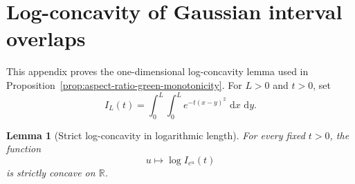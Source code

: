 \documentclass[11pt]{article}
\newtheorem{lemma}[theorem]{Lemma}
\newcommand{\R}{\mathbb{R}}
\newcommand{\dd}{\,\mathrm{d}}
\begin{document}
\section{Log-concavity of Gaussian interval overlaps}
\label{app:interval-overlap-log-concavity}

This appendix proves the one-dimensional log-concavity lemma used in
Proposition~\ref{prop:aspect-ratio-green-monotonicity}.  For \(L>0\) and
\(t>0\), set
\[
    I_L(t)=\int_0^L\int_0^L e^{-t(x-y)^2}\,\dd x\,\dd y.
\]

\begin{lemma}[Strict log-concavity in logarithmic length]
\label{lem:gaussian-interval-log-concavity}
For every fixed \(t>0\), the function
\[
    u\longmapsto \log I_{e^u}(t)
\]
is strictly concave on \(\R\).
\end{lemma}
\end{document}
